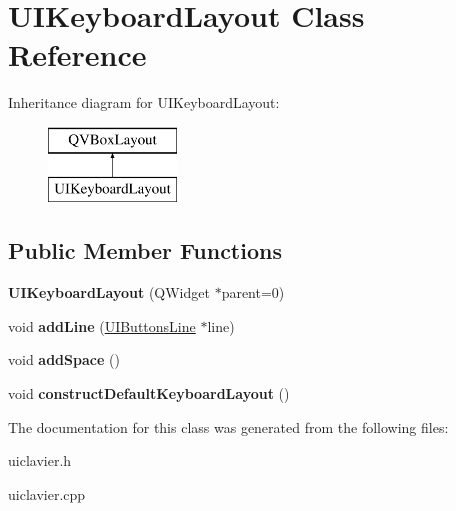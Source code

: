 \hypertarget{class_u_i_keyboard_layout}{}\section{U\+I\+Keyboard\+Layout Class Reference}
\label{class_u_i_keyboard_layout}
Inheritance diagram for U\+I\+Keyboard\+Layout\+:\begin{figure}[H]
\begin{center}
\leavevmode
\includegraphics[height=2.000000cm]{class_u_i_keyboard_layout}
\end{center}
\end{figure}
\subsection*{Public Member Functions}
\begin{DoxyCompactItemize}
\item 
{\bfseries U\+I\+Keyboard\+Layout} (Q\+Widget $\ast$parent=0)\hypertarget{class_u_i_keyboard_layout_ada2f2346e9aa226d41817f3c02016a8d}{}\label{class_u_i_keyboard_layout_ada2f2346e9aa226d41817f3c02016a8d}

\item 
void {\bfseries add\+Line} (\hyperlink{class_u_i_buttons_line}{U\+I\+Buttons\+Line} $\ast$line)\hypertarget{class_u_i_keyboard_layout_a897a6a8ca96f84ec6c5f9602a08e1b59}{}\label{class_u_i_keyboard_layout_a897a6a8ca96f84ec6c5f9602a08e1b59}

\item 
void {\bfseries add\+Space} ()\hypertarget{class_u_i_keyboard_layout_aed3da263a7e1222b618a3f58930cc4d6}{}\label{class_u_i_keyboard_layout_aed3da263a7e1222b618a3f58930cc4d6}

\item 
void {\bfseries construct\+Default\+Keyboard\+Layout} ()\hypertarget{class_u_i_keyboard_layout_a73c588c83f729692bc1b0c2d4b5e50fd}{}\label{class_u_i_keyboard_layout_a73c588c83f729692bc1b0c2d4b5e50fd}

\end{DoxyCompactItemize}


The documentation for this class was generated from the following files\+:\begin{DoxyCompactItemize}
\item 
uiclavier.\+h\item 
uiclavier.\+cpp\end{DoxyCompactItemize}
